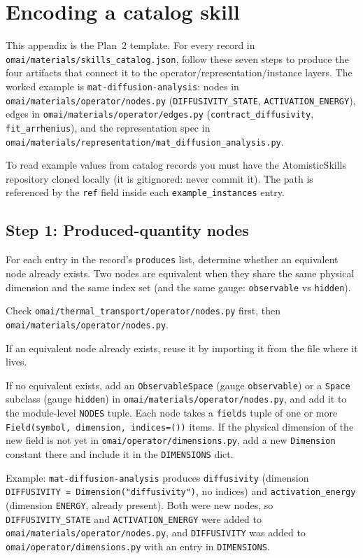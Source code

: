 \documentclass[11pt,a4paper]{article}
\begin{document}
\section{Encoding a catalog skill}
\label{app:encode}

\noindent This appendix is the Plan~2 template. For every record in
\texttt{omai/materials/skills\_catalog.json}, follow these seven steps to produce
the four artifacts that connect it to the operator/representation/instance layers.
The worked example is \texttt{mat-diffusion-analysis}: nodes in
\texttt{omai/materials/operator/nodes.py} (\texttt{DIFFUSIVITY\_STATE},
\texttt{ACTIVATION\_ENERGY}), edges in \texttt{omai/materials/operator/edges.py}
(\texttt{contract\_diffusivity}, \texttt{fit\_arrhenius}), and the representation
spec in \texttt{omai/materials/representation/mat\_diffusion\_analysis.py}.

To read example values from catalog records you must have the AtomisticSkills
repository cloned locally (it is gitignored: never commit it). The path is
referenced by the \texttt{ref} field inside each \texttt{example\_instances} entry.

\subsection{Step 1: Produced-quantity nodes}

For each entry in the record's \texttt{produces} list, determine whether an
equivalent node already exists. Two nodes are equivalent when they share the same
physical dimension and the same index set (and the same gauge: \texttt{observable}
vs \texttt{hidden}).

Check \texttt{omai/thermal\_transport/operator/nodes.py} first, then
\texttt{omai/materials/operator/nodes.py}.

If an equivalent node already exists, reuse it by importing it from the file where
it lives.

If no equivalent exists, add an \texttt{ObservableSpace} (gauge
\texttt{observable}) or a \texttt{Space} subclass (gauge \texttt{hidden}) in
\texttt{omai/materials/operator/nodes.py}, and add it to the module-level
\texttt{NODES} tuple. Each node takes a \texttt{fields} tuple of one or more
\texttt{Field(symbol, dimension, indices=())} items. If the physical dimension of
the new field is not yet in \texttt{omai/operator/dimensions.py}, add a new
\texttt{Dimension} constant there and include it in the \texttt{DIMENSIONS} dict.

Example: \texttt{mat-diffusion-analysis} produces \texttt{diffusivity} (dimension
\texttt{DIFFUSIVITY = Dimension("diffusivity")}, no indices) and
\texttt{activation\_energy} (dimension \texttt{ENERGY}, already present). Both were
new nodes, so \texttt{DIFFUSIVITY\_STATE} and \texttt{ACTIVATION\_ENERGY} were
added to \texttt{omai/materials/operator/nodes.py}, and \texttt{DIFFUSIVITY} was
added to \texttt{omai/operator/dimensions.py} with an entry in \texttt{DIMENSIONS}.
\end{document}
